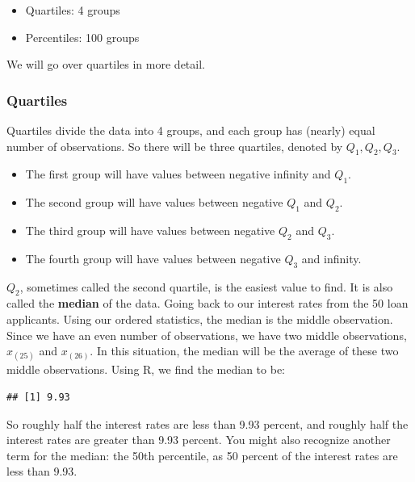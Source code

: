\documentclass[
]{book}
\newenvironment{Shaded}{\begin{snugshade}}{\end{snugshade}}
\newcommand{\FunctionTok}[1]{\textcolor[rgb]{0.13,0.29,0.53}{\textbf{#1}}}
\newcommand{\NormalTok}[1]{#1}
\newcommand{\SpecialCharTok}[1]{\textcolor[rgb]{0.81,0.36,0.00}{\textbf{#1}}}
\providecommand{\tightlist}{%
  \setlength{\itemsep}{0pt}\setlength{\parskip}{0pt}}
\begin{document}
\begin{itemize}
\tightlist
\item
  Quartiles: 4 groups
\item
  Percentiles: 100 groups
\end{itemize}

We will go over quartiles in more detail.

\subsubsection{Quartiles}\label{quart}

Quartiles divide the data into 4 groups, and each group has (nearly) equal number of observations. So there will be three quartiles, denoted by \(Q_1, Q_2, Q_3\).

\begin{itemize}
\tightlist
\item
  The first group will have values between negative infinity and \(Q_1\).
\item
  The second group will have values between negative \(Q_1\) and \(Q_2\).
\item
  The third group will have values between negative \(Q_2\) and \(Q_3\).
\item
  The fourth group will have values between negative \(Q_3\) and infinity.
\end{itemize}

\(Q_2\), sometimes called the second quartile, is the easiest value to find. It is also called the \textbf{median} of the data. Going back to our interest rates from the 50 loan applicants. Using our ordered statistics, the median is the middle observation. Since we have an even number of observations, we have two middle observations, \(x_{(25)}\) and \(x_{(26)}\). In this situation, the median will be the average of these two middle observations. Using R, we find the median to be:

\begin{Shaded}
\end{Shaded}

\begin{verbatim}
## [1] 9.93
\end{verbatim}

So roughly half the interest rates are less than 9.93 percent, and roughly half the interest rates are greater than 9.93 percent. You might also recognize another term for the median: the 50th percentile, as 50 percent of the interest rates are less than 9.93.
\end{document}
